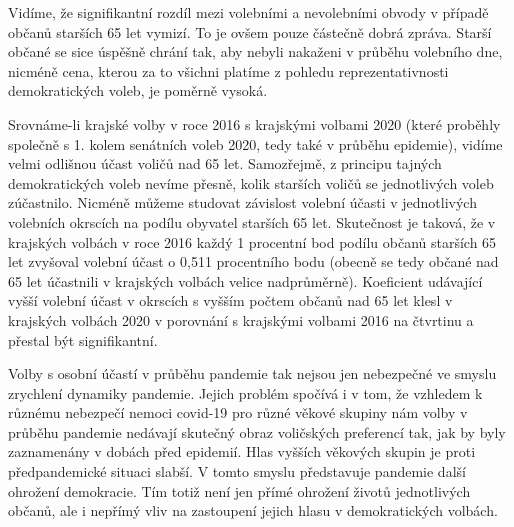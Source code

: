 Vidíme, že signifikantní rozdíl mezi volebními a nevolebními obvody v případě občanů starších 65 let vymizí. To je ovšem pouze částečně dobrá zpráva. Starší občané se sice úspěšně chrání tak, aby nebyli nakaženi v průběhu volebního dne, nicméně cena, kterou za to všichni platíme z pohledu reprezentativnosti demokratických voleb, je poměrně vysoká. 

Srovnáme-li krajské volby v roce 2016 s krajskými volbami 2020 (které proběhly společně s 1. kolem senátních voleb 2020, tedy také v průběhu epidemie), vidíme velmi odlišnou účast voličů nad 65 let. Samozřejmě, z principu tajných demokratických voleb nevíme přesně, kolik starších voličů se jednotlivých voleb zúčastnilo. Nicméně můžeme studovat závislost volební účasti v jednotlivých volebních okrscích na podílu obyvatel starších 65 let. Skutečnost je taková, že v krajských volbách v roce 2016 každý 1 procentní bod podílu občanů starších 65 let zvyšoval volební účast o 0,511 procentního bodu (obecně se tedy občané nad 65 let účastnili v krajských volbách velice nadprůměrně). Koeficient udávající vyšší volební účast v okrscích s vyšším počtem občanů nad 65 let klesl v krajských volbách 2020 v porovnání s krajskými volbami 2016 na čtvrtinu a přestal být signifikantní.

Volby s osobní účastí v průběhu pandemie tak nejsou jen nebezpečné ve smyslu zrychlení dynamiky pandemie. Jejich problém spočívá i v tom, že vzhledem k různému nebezpečí nemoci covid-19 pro různé věkové skupiny nám volby v průběhu pandemie nedávají skutečný obraz voličských preferencí tak, jak by byly zaznamenány v dobách před epidemií. Hlas vyšších věkových skupin je proti předpandemické situaci slabší. V tomto smyslu představuje pandemie další ohrožení demokracie. Tím totiž není jen přímé ohrožení životů jednotlivých občanů, ale i nepřímý vliv na zastoupení jejich hlasu v demokratických volbách.

